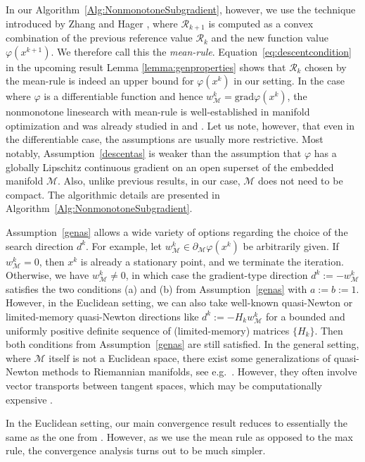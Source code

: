 \documentclass[a4paper, 12pt]{article}
\numberwithin{equation}{section}
\theoremstyle{bolddef}
\theoremstyle{definition}
\theoremstyle{boldplain}
\newcommand{\xk}{x^k}
\newcommand{\wk}{w^k}
\newcommand{\dk}{d^k}
\newcommand{\xkp}{x^{k+1}}
\newcommand{\Rvalue}{\mathcal{R}}
\newcommand{\grad}{\mathrm{grad}}
\begin{document}
In our Algorithm~\ref{Alg:NonmonotoneSubgradient}, however, we use
the technique introduced by Zhang and Hager \cite{ZhangHager2004}, 
where $ \Rvalue_{k+1} $
is computed as a convex combination of the previous reference value
$ \Rvalue_k $ and the new function value $ \varphi (\xkp) $. We 
therefore call this the \emph{mean-rule}. Equation~\eqref{eq:descentcondition} in the upcoming result Lemma \ref{lemma:genproperties} shows that $\Rvalue_k$ chosen by the mean-rule is indeed an upper bound for $\varphi(\xk)$ in our setting. 
In the case where $\varphi$ is a differentiable function and hence $\wk_\mathcal{M} = \grad \varphi(\xk)$,
the nonmonotone linesearch with mean-rule is well-established in manifold optimization and was
already studied in \cite{Oviedo2022} and \cite{Qian2024}. Let us note, however, that even in the differentiable case, 
the assumptions are usually more restrictive. Most notably, Assumption~\ref{descentas} is weaker than the assumption 
that $\varphi$ has a globally Lipschitz continuous gradient on an open superset of the embedded manifold $\mathcal{M}$.
Also, unlike previous results, in our case, $\mathcal{M}$ does not need to be compact. The algorithmic details are presented in Algorithm~\ref{Alg:NonmonotoneSubgradient}.

Assumption~\ref{genas} allows a wide variety of options regarding the choice
of the search direction $ \dk $. For example, let $ \wk_\mathcal{M} \in \partial_\mathcal{M} 
\varphi (\xk) $ be arbitrarily given. If $ \wk_\mathcal{M} = 0 $, then $ \xk $
is already a stationary point, and we terminate the iteration. Otherwise,
we have $ \wk_\mathcal{M} \neq 0 $, in which case the gradient-type direction
$ \dk := - \wk_\mathcal{M} $ satisfies the two conditions (a) and (b) from 
Assumption~\ref{genas} with $ a:= b:= 1 $. However, in the Euclidean setting, 
we can also take well-known quasi-Newton or limited-memory quasi-Newton directions
like $ \dk := -H_k \wk_\mathcal{M} $ for a bounded and uniformly positive definite 
sequence of (limited-memory) matrices $ \{ H_k \} $. Then both conditions
from Assumption~\ref{genas} are still satisfied. In the general setting, where $\mathcal{M}$ itself is 
not a Euclidean space, there exist some generalizations of quasi-Newton methods to Riemannian manifolds, see e.g.\ \cite{Qi2010, Huang2016}.
However, they often involve vector transports between tangent spaces, which may be computationally expensive \cite{Godaz2021}.

In the Euclidean setting, our main convergence result reduces to
essentially the same as the one from \cite{aragon2025}. However, 
as we use the mean rule as opposed to the max rule, the convergence analysis turns out to be much 
simpler.
\end{document}

